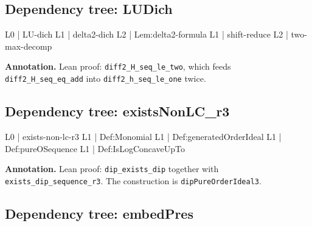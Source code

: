 \documentclass[11pt,reqno]{amsart}
\begin{document}
\medskip

\subsection*{Dependency tree: \textsf{LUDich}}

\noindent%
\begin{minipage}[t]{0.48\linewidth}
	\vspace{0pt}
	\begin{verbatimbox}
		L0 | LU-dich
		L1 |   delta2-dich
		L2 |     Lem:delta2-formula
		L1 |   shift-reduce
		L2 |     two-max-decomp
	\end{verbatimbox}
\end{minipage}\hfill 
\begin{minipage}[t]{0.48\linewidth}
	\vspace{0pt}
	\textbf{Annotation.} Lean proof: \texttt{diff2\_H\_seq\_le\_two}, which feeds \texttt{diff2\_H\_seq\_eq\_add} into \texttt{diff2\_h\_seq\_le\_one} twice.
\end{minipage}

\medskip

\subsection*{Dependency tree: \textsf{existsNonLC\_r3}}

\noindent%
\begin{minipage}[t]{0.48\linewidth}
	\vspace{0pt}
	\begin{verbatimbox}
		L0 | exists-non-lc-r3
		L1 |   Def:Monomial
		L1 |   Def:generatedOrderIdeal
		L1 |   Def:pureOSequence
		L1 |   Def:IsLogConcaveUpTo
	\end{verbatimbox}
\end{minipage}\hfill 
\begin{minipage}[t]{0.48\linewidth}
	\vspace{0pt}
	\textbf{Annotation.} Lean proof: \texttt{dip\_exists\_dip} together with \texttt{exists\_dip\_sequence\_r3}. The construction is \texttt{dipPureOrderIdeal3}.
\end{minipage}

\medskip

\subsection*{Dependency tree: \textsf{embedPres}}
\end{document}
